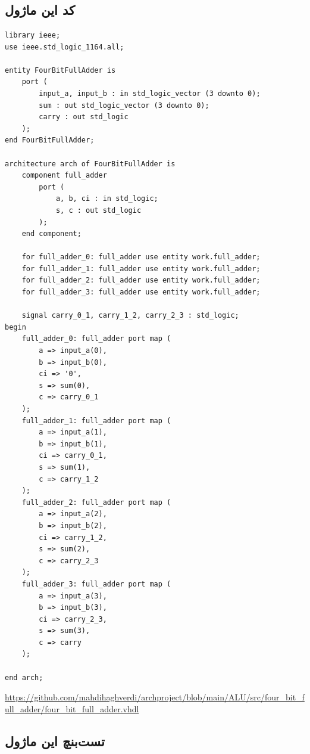 \documentclass[dvipsnames, svgnames, x11names, a4paper, 11pt, oneside]{book}
\begin{document}
				\section{}
					\subsection{کد این ماژول}
					\begin{latin}
						\begin{lstlisting}
library ieee;
use ieee.std_logic_1164.all;

entity FourBitFullAdder is
	port (
		input_a, input_b : in std_logic_vector (3 downto 0);
		sum : out std_logic_vector (3 downto 0);
		carry : out std_logic
	);
end FourBitFullAdder;

architecture arch of FourBitFullAdder is
	component full_adder
		port (
			a, b, ci : in std_logic;
			s, c : out std_logic
		);
	end component;
	
	for full_adder_0: full_adder use entity work.full_adder;
	for full_adder_1: full_adder use entity work.full_adder;
	for full_adder_2: full_adder use entity work.full_adder;
	for full_adder_3: full_adder use entity work.full_adder;
	
	signal carry_0_1, carry_1_2, carry_2_3 : std_logic;
begin
	full_adder_0: full_adder port map (
		a => input_a(0),
		b => input_b(0),
		ci => '0',
		s => sum(0),
		c => carry_0_1
	);
	full_adder_1: full_adder port map (
		a => input_a(1),
		b => input_b(1),
		ci => carry_0_1,
		s => sum(1),
		c => carry_1_2
	);
	full_adder_2: full_adder port map (
		a => input_a(2),
		b => input_b(2),
		ci => carry_1_2,
		s => sum(2),
		c => carry_2_3
	);
	full_adder_3: full_adder port map (
		a => input_a(3),
		b => input_b(3),
		ci => carry_2_3,
		s => sum(3),
		c => carry
	);

end arch;
						\end{lstlisting}
					\url{https://github.com/mahdihaghverdi/archproject/blob/main/ALU/src/four_bit_full_adder/four_bit_full_adder.vhdl}
					\end{latin}
				
						
					\subsection{تست‌‌بنچ این ماژول}
					
\end{document}
